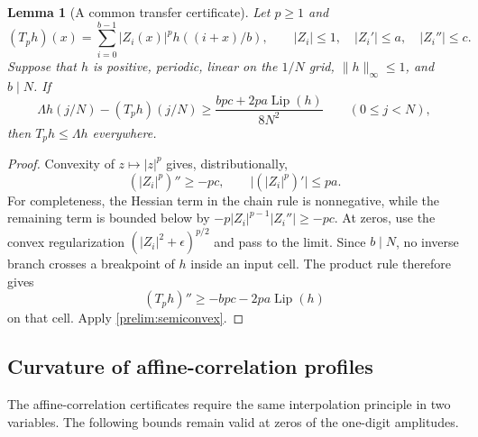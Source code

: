 \documentclass[11pt,a4paper]{article}
\theoremstyle{paperplain}
\newtheorem{lemma}[theorem]{Lemma}
\numberwithin{equation}{section}
\begin{document}
\begin{lemma}[A common transfer certificate]\label{prelim:operator-cert}
Let $p\geqslant1$ and
\[
 (T_ph)(x)=\sum_{i=0}^{b-1}|Z_i(x)|^p h((i+x)/b),
 \qquad |Z_i|\leqslant1,\quad |Z_i'|\leqslant a,\quad |Z_i''|\leqslant c.
\]
Suppose that $h$ is positive, periodic, linear on the $1/N$ grid,
$\|h\|_\infty\leqslant1$, and $b\mid N$. If
\[
 \Lambda h(j/N)-(T_ph)(j/N)
 \geqslant\frac{bpc+2pa\operatorname{Lip}(h)}{8N^2}
 \qquad(0\leqslant j<N),
\]
then $T_ph\leqslant\Lambda h$ everywhere.
\end{lemma}
\begin{proof}
Convexity of $z\mapsto|z|^p$ gives, distributionally,
\[
 (|Z_i|^p)''\geqslant-pc,\qquad
 \bigl|(|Z_i|^p)'\bigr|\leqslant pa.
\]
For completeness, the Hessian term in the chain rule is nonnegative,
while the remaining term is bounded below by
$-p|Z_i|^{p-1}|Z_i''|\geqslant-pc$. At zeros, use the convex
regularization $(|Z_i|^2+\epsilon)^{p/2}$ and pass to the limit.
Since $b\mid N$, no inverse branch crosses a breakpoint of $h$ inside
an input cell. The product rule therefore gives
\[
 (T_ph)''\geqslant-bpc-2pa\operatorname{Lip}(h)
\]
on that cell. Apply \eqref{prelim:semiconvex}.
\end{proof}

\subsection{Curvature of affine-correlation profiles}

The affine-correlation certificates require the same interpolation principle
in two variables. The following bounds remain valid at zeros of the
one-digit amplitudes.
\end{document}
